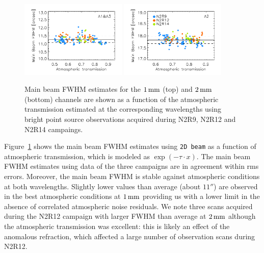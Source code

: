 \begin{figure}[!thbp]
\begin{center}
  \includegraphics[clip, width=0.45\textwidth]{Figures/plot_FWHM_vs_atmtrans_mb_radius_binning2_1mm.pdf}
  \includegraphics[clip, width=0.45\textwidth]{Figures/plot_FWHM_vs_atmtrans_mb_radius_binning2_a2.pdf}
  \caption[Main Beam FWHM]{Main beam FWHM estimates for the
    $1\,\rm{mm}$ (top) and $2\,\rm{mm}$ (bottom) channels are shown as
    a function of the atmospheric transmission estimated at the
    corresponding wavelengths using bright point source observations
  acquired during N2R9, N2R12 and N2R14 campaings. }
\label{fig:fwhm_map_atmtrans}
\end{center}
\end{figure}

Figure~\ref{fig:fwhm_map_atmtrans} shows the main beam FWHM estimates
using {\tt 2D beam} as a function of atmospheric transmission,
which is modeled as $\exp{\left(-\tau \cdot x\right)}$.%
The main beam FWHM estimates using data of the three campaigns are in
agreement within rms errors. Moreover, the main beam FWHM is stable
against atmospheric conditions at both wavelengths. Slightly lower
values than average (about $11''$) are observed in the best
atmospheric conditions at $1\,\rm{mm}$ providing us with a lower limit
in the absence of correlated atmospheric noise residuals. We note
three scans acquired during the N2R12 campaign with larger FWHM than average at
$2\,\rm{mm}$ although the atmospheric transmission was excellent: this
is likely an effect of the anomalous refraction, which affected a
large number of observation scans during N2R12. 



